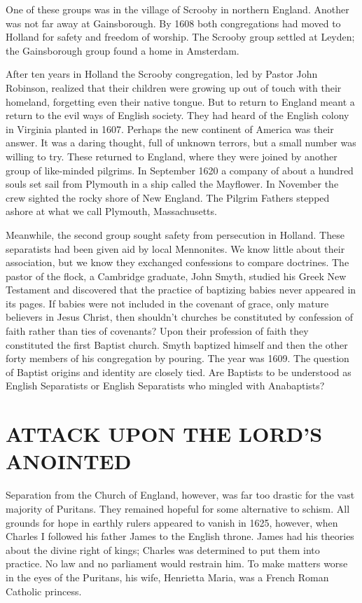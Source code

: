 One of these groups was in the village of Scrooby in northern England. Another was not far away at
Gainsborough. By 1608 both congregations had moved to Holland for safety and freedom of worship. The
Scrooby group settled at Leyden; the Gainsborough group found a home in Amsterdam.

After ten years in Holland the Scrooby congregation, led by Pastor John Robinson, realized that
their children were growing up out of touch with their homeland, forgetting even their native
tongue. But to return to England meant a return to the evil ways of English society. They had heard
of the English colony in Virginia planted in 1607. Perhaps the new continent of America was their
answer. It was a daring thought, full of unknown terrors, but a small number was willing to try.
These returned to England, where they were joined by another group of like-minded pilgrims. In
September 1620 a company of about a hundred souls set sail from Plymouth in a ship called the
Mayflower. In November the crew sighted the rocky shore of New England. The Pilgrim Fathers stepped
ashore at what we call Plymouth, Massachusetts.

Meanwhile, the second group sought safety from persecution in Holland. These separatists had been
given aid by local Mennonites. We know little about their association, but we know they exchanged
confessions to compare doctrines. The pastor of the flock, a Cambridge graduate, John Smyth, studied
his Greek New Testament and discovered that the practice of baptizing babies never appeared in its
pages. If babies were not included in the covenant of grace, only mature believers in Jesus Christ,
then shouldn’t churches be constituted by confession of faith rather than ties of covenants? Upon
their profession of faith they constituted the first Baptist church. Smyth baptized himself and then
the other forty members of his congregation by pouring. The year was 1609. The question of Baptist
origins and identity are closely tied. Are Baptists to be understood as English Separatists or
English Separatists who mingled with Anabaptists?

\section{ATTACK UPON THE LORD’S ANOINTED}

Separation from the Church of England, however, was far too drastic for the vast majority of
Puritans. They remained hopeful for some alternative to schism. All grounds for hope in earthly
rulers appeared to vanish in 1625, however, when Charles I followed his father James to the English
throne. James had his theories about the divine right of kings; Charles was determined to put them
into practice. No law and no parliament would restrain him. To make matters worse in the eyes of the
Puritans, his wife, Henrietta Maria, was a French Roman Catholic princess.


